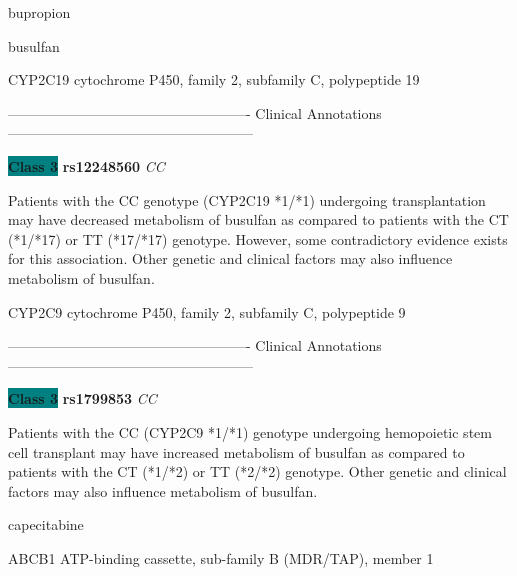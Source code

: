 \documentclass{resume} %
\begin{document}
\begin{rSection}{ bupropion }
\end{rSection}\begin{rSection}{ busulfan }
\item[]

\begin{rSubsection}{ CYP2C19 }{ cytochrome P450, family 2, subfamily C, polypeptide 19 }{}{}
\item[]

\item[] ---------------------------------------------------- Clinical Annotations -----------------------------------------------------\newline
\item \textbf{\colorbox{teal} {Class 3}} \textbf{ rs12248560 } \textit{ CC }
\item[] Patients with the CC genotype (CYP2C19 *1/*1) undergoing transplantation may have decreased metabolism of busulfan as compared to patients with the CT (*1/*17) or TT (*17/*17) genotype. However, some contradictory evidence exists for this association. Other genetic and clinical factors may also influence metabolism of busulfan.
\end{rSubsection}\begin{rSubsection}{ CYP2C9 }{ cytochrome P450, family 2, subfamily C, polypeptide 9 }{}{}
\item[]

\item[] ---------------------------------------------------- Clinical Annotations -----------------------------------------------------\newline
\item \textbf{\colorbox{teal} {Class 3}} \textbf{ rs1799853 } \textit{ CC }
\item[] Patients with the CC (CYP2C9 *1/*1) genotype undergoing hemopoietic stem cell transplant may have increased metabolism of busulfan as compared to patients with the CT (*1/*2) or TT (*2/*2) genotype. Other genetic and clinical factors may also influence metabolism of busulfan.
\end{rSubsection}

\end{rSection}\begin{rSection}{ capecitabine }
\item[]

\begin{rSubsection}{ ABCB1 }{ ATP-binding cassette, sub-family B (MDR/TAP), member 1 }{}{}
\item[]


\end{rSubsection}
\end{rSection}
\end{document}
